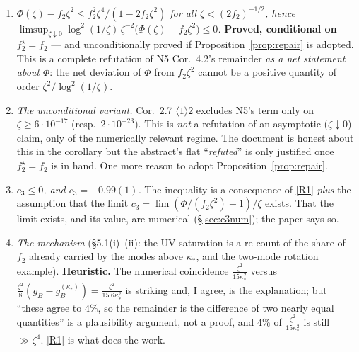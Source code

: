 \documentclass[11pt]{article}
\begin{document}
\begin{enumerate}[label=(R\arabic*),leftmargin=3em]
\item\label{R1} \emph{$\Phi(\zeta)-f_2\zeta^2\le f_2^2\zeta^4/(1-2f_2\zeta^2)$ for all
 $\zeta<(2f_2)^{-1/2}$, hence
 $\limsup_{\zeta\downarrow0}\log^2(1/\zeta)\,\zeta^{-2}\bigl(\Phi(\zeta)-f_2\zeta^2\bigr)\le0$.}
 \textbf{Proved, conditional on $f_2^\star=f_2$} --- and unconditionally proved if
 Proposition~\ref{prop:repair} is adopted.  This is a complete refutation of N5 Cor.~4.2's
 remainder \emph{as a net statement about $\Phi$}: the net deviation of $\Phi$ from $f_2\zeta^2$
 cannot be a positive quantity of order $\zeta^2/\log^2(1/\zeta)$.
\item\label{R2} \emph{The unconditional variant.}  Cor.~2.7 $\langle1\rangle2$ excludes N5's term
 only on $\zeta\ge6\cdot10^{-17}$ (resp.\ $2\cdot10^{-23}$).  This is \emph{not} a refutation of an
 asymptotic ($\zeta\downarrow0$) claim, only of the numerically relevant regime.  The document is
 honest about this in the corollary but the abstract's flat ``\emph{refuted}'' is only justified
 once $f_2^\star=f_2$ is in hand.  One more reason to adopt Proposition~\ref{prop:repair}.
\item\label{R3} \emph{$c_3\le0$, and $c_3=-0.99(1)$.}  The inequality is a consequence of
 \ref{R1} \emph{plus} the assumption that the limit $c_3=\lim(\Phi/(f_2\zeta^2)-1)/\zeta$ exists.
 That the limit exists, and its value, are numerical (\S\ref{sec:c3num}); the paper says so.
\item\label{R4} \emph{The mechanism} (\S5.1(i)--(ii): the UV saturation is a re-count of the share
 of $f_2$ already carried by the modes above $\kappa_*$, and the two-mode rotation example).
 \textbf{Heuristic.}  The numerical coincidence $\frac{\zeta^2}{15\kappa_*^2}$ versus
 $\frac{\zeta^2}8(g_B-g_B^{(\kappa_*)})=\frac{\zeta^2}{15.6\kappa_*^2}$ is striking and, I agree,
 is the explanation; but ``these agree to $4\%$, so the remainder is the difference of two nearly
 equal quantities'' is a plausibility argument, not a proof, and $4\%$ of
 $\frac{\zeta^2}{15\kappa_*^2}$ is still $\gg\zeta^4$.  \ref{R1} is what does the work.
\end{enumerate}
\end{document}
